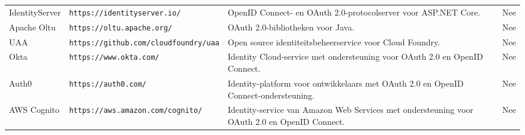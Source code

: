 \begin{table}[htbp]
\begin{adjustbox}{width=1\textwidth}
\begin{tabular}{@{}llll@{}}
    IdentityServer & \texttt{https://identityserver.io/}    & OpenID Connect- en OAuth 2.0-protocolserver voor ASP.NET Core.               & Nee                       \\
    Apache Oltu   & \texttt{https://oltu.apache.org/}      & OAuth 2.0-bibliotheken voor Java.                                             & Nee                       \\
    UAA           & \texttt{https://github.com/cloudfoundry/uaa} & Open source identiteitsbeheerservice voor Cloud Foundry.                & Nee                       \\
    Okta          & \texttt{https://www.okta.com/}         & Identity Cloud-service met ondersteuning voor OAuth 2.0 en OpenID Connect.    & Nee                       \\
    Auth0         & \texttt{https://auth0.com/}            & Identity-platform voor ontwikkelaars met OAuth 2.0 en OpenID Connect-ondersteuning. & Nee                       \\
    AWS Cognito   & \texttt{https://aws.amazon.com/cognito/} & Identity-service van Amazon Web Services met ondersteuning voor OAuth 2.0 en OpenID Connect. & Nee                       \\ \bottomrule
  \end{tabular}
  \end{adjustbox}
\end{table}
